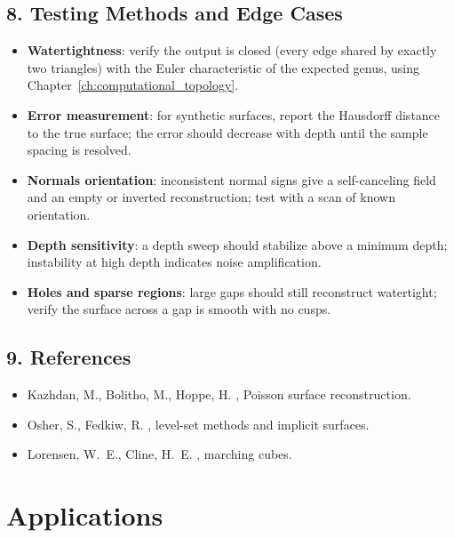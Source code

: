 \subsection{8. Testing Methods and Edge Cases}

\begin{itemize}
  \item \textbf{Watertightness}: verify the output is closed (every edge shared
    by exactly two triangles) with the Euler characteristic of the expected
    genus, using Chapter~\ref{ch:computational_topology}.
  \item \textbf{Error measurement}: for synthetic surfaces, report the
    Hausdorff distance to the true surface; the error should decrease with
    depth until the sample spacing is resolved.
  \item \textbf{Normals orientation}: inconsistent normal signs give a
    self-canceling field and an empty or inverted reconstruction; test with a
    scan of known orientation.
  \item \textbf{Depth sensitivity}: a depth sweep should stabilize above a
    minimum depth; instability at high depth indicates noise amplification.
  \item \textbf{Holes and sparse regions}: large gaps should still reconstruct
    watertight; verify the surface across a gap is smooth with no cusps.
\end{itemize}

\subsection{9. References}

\begin{itemize}
  \item Kazhdan, M., Bolitho, M., Hoppe, H. \cite{kazhdan2006}, Poisson
    surface reconstruction.
  \item Osher, S., Fedkiw, R. \cite{osher2003}, level-set methods and implicit
    surfaces.
  \item Lorensen, W.~E., Cline, H.~E. \cite{lorensen1987}, marching cubes.
\end{itemize}


\section{Applications}
\label{sec:shape_applications}

